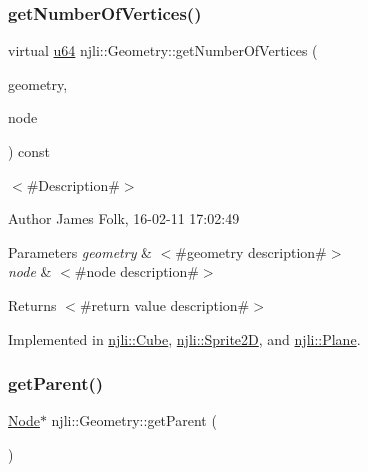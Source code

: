 \subsubsection{\texorpdfstring{get\+Number\+Of\+Vertices()}{getNumberOfVertices()}}
{\footnotesize\ttfamily virtual \mbox{\hyperlink{_util_8h_ad758b7a5c3f18ed79d2fcd23d9f16357}{u64}} njli\+::\+Geometry\+::get\+Number\+Of\+Vertices (\begin{DoxyParamCaption}\item[{\mbox{\hyperlink{classnjli_1_1_level_of_detail}{Level\+Of\+Detail}} $\ast$}]{geometry,  }\item[{\mbox{\hyperlink{classnjli_1_1_node}{Node}} $\ast$}]{node }\end{DoxyParamCaption}) const\hspace{0.3cm}{\ttfamily [pure virtual]}}



$<$\#\+Description\#$>$ 

\begin{DoxyAuthor}{Author}
James Folk, 16-\/02-\/11 17\+:02\+:49
\end{DoxyAuthor}

\begin{DoxyParams}{Parameters}
{\em geometry} & $<$\#geometry description\#$>$ \\
\hline
{\em node} & $<$\#node description\#$>$\\
\hline
\end{DoxyParams}
\begin{DoxyReturn}{Returns}
$<$\#return value description\#$>$ 
\end{DoxyReturn}


Implemented in \mbox{\hyperlink{classnjli_1_1_cube_a62a69318d5cb98a56f81f91968efcc8e}{njli\+::\+Cube}}, \mbox{\hyperlink{classnjli_1_1_sprite2_d_a96d489e0131032c64a150cd1629fd0e5}{njli\+::\+Sprite2D}}, and \mbox{\hyperlink{classnjli_1_1_plane_a6e25a6d9b9819d375c257b68a1e8a6d6}{njli\+::\+Plane}}.

\mbox{\label{classnjli_1_1_geometry_a6547f3d712e0507d79e47b162360eab0}} 
\subsubsection{\texorpdfstring{get\+Parent()}{getParent()}\hspace{0.1cm}{\footnotesize\ttfamily [1/2]}}
{\footnotesize\ttfamily \mbox{\hyperlink{classnjli_1_1_node}{Node}}$\ast$ njli\+::\+Geometry\+::get\+Parent (\begin{DoxyParamCaption}{ }\end{DoxyParamCaption})\hspace{0.3cm}{\ttfamily [protected]}}

